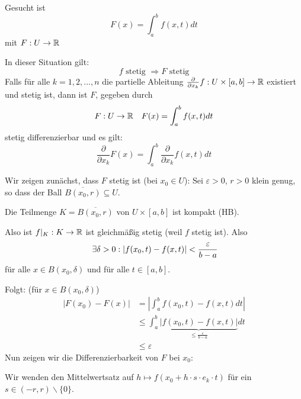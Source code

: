 \documentclass[main.tex]{subfiles}
\begin{document}
Gesucht ist
$$F(x) = \int_a^b f(x,t) dt$$
mit $F: U \to \mathbb{R}$

\begin{Theorem}
  In dieser Situation gilt:
  $$f \text{ stetig } \Rightarrow F \text{ stetig}$$
  Falls für alle $k = 1,2,...,n$ die partielle Ableitung $\frac{\partial}{\partial x_k} f : U \times [a,b] \to \mathbb{R}$ existiert und stetig ist, dann ist $F$, gegeben durch
  $$F: U \to \mathbb{R} \quad F(x) = \int_a^b f(x,t) dt$$
  stetig differenzierbar und es gilt:
  $$\dfrac{\partial}{\partial x_k} F(x) = \int_a^b \dfrac{\partial}{\partial x_k} f(x,t) dt$$
\end{Theorem}

\begin{Beweis}
  Wir zeigen zunächst, dass $F$ stetig ist (bei $x_0 \in U$): Sei $\varepsilon > 0$, $r > 0$ klein genug, so dass der Ball $\overline{B(x_0, r)} \subseteq U$.

  Die Teilmenge $K = \overline{B(x_0, r)}$ von $U \times [a,b]$ ist kompakt (HB).

  Also ist $f|_K : K \to \mathbb{R}$ ist gleichmäßig stetig (weil $f$ stetig ist). Also
  $$\;\exists \delta > 0 : |f(x_0, t) - f(x, t)| < \dfrac{\varepsilon}{b - a}$$
  für alle $x \in B(x_0, \delta)$ und für alle $t \in [a,b]$.

  Folgt: (für $x \in B(x_0,\delta)$)
  $$\begin{aligned}
    |F(x_0) - F(x)| & = \left|\int_a^b f(x_0,t) - f(x,t) dt \right| \\
    & \leq \int_a^b \underbrace{|f(x_0,t) - f(x,t)|}_{\leq \frac{\varepsilon}{b-a}} dt \\
    & \leq \varepsilon
  \end{aligned}$$
  Nun zeigen wir die Differenzierbarkeit von $F$ bei $x_0$:

  Wir wenden den Mittelwertsatz auf $h \mapsto f(x_0 + h \cdot s \cdot e_k \cdot t)$ für ein $s \in (-r,r)\backslash\{0\}$.


\end{Beweis}
\end{document}
